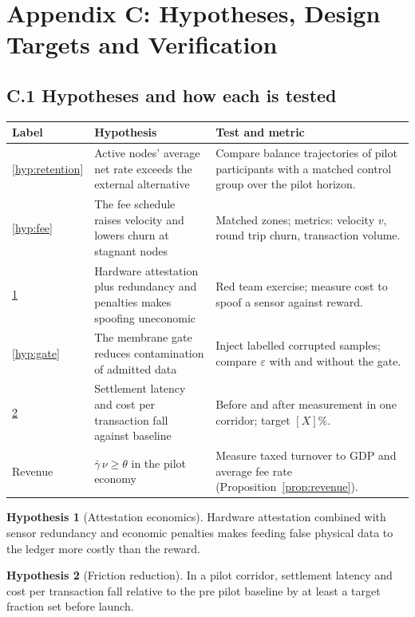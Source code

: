 \documentclass[11pt,a4paper]{article}
\theoremstyle{definition}
\newtheorem{hypothesis}{Hypothesis}
\theoremstyle{plain}
\theoremstyle{remark}
\begin{document}
\clearpage
\clearpage
\section*{Appendix C: Hypotheses, Design Targets and Verification}
\subsection*{C.1 Hypotheses and how each is tested}
\begin{longtable}{@{}p{1.5cm}p{6.5cm}p{7.2cm}@{}}
\toprule
Label & Hypothesis & Test and metric \\
\midrule
\endhead
\ref{hyp:retention} & Active nodes' average net rate exceeds the external alternative & Compare balance trajectories of pilot participants with a matched control group over the pilot horizon. \\
\ref{hyp:fee} & The fee schedule raises velocity and lowers churn at stagnant nodes & Matched zones; metrics: velocity $v$, round trip churn, transaction volume. \\
\ref{hyp:attest} & Hardware attestation plus redundancy and penalties makes spoofing uneconomic & Red team exercise; measure cost to spoof a sensor against reward. \\
\ref{hyp:gate} & The membrane gate reduces contamination of admitted data & Inject labelled corrupted samples; compare $\varepsilon$ with and without the gate. \\
\ref{hyp:friction} & Settlement latency and cost per transaction fall against baseline & Before and after measurement in one corridor; target $[X]\%$. \\
Revenue & $\bar\gamma\,\nu \ge \theta$ in the pilot economy & Measure taxed turnover to GDP and average fee rate (Proposition~\ref{prop:revenue}). \\
\bottomrule
\end{longtable}

\begin{hypothesis}[Attestation economics]\label{hyp:attest}
Hardware attestation combined with sensor redundancy and economic penalties makes feeding false physical data to the ledger more costly than the reward.
\end{hypothesis}
\begin{hypothesis}[Friction reduction]\label{hyp:friction}
In a pilot corridor, settlement latency and cost per transaction fall relative to the pre pilot baseline by at least a target fraction set before launch.
\end{hypothesis}
\end{document}
